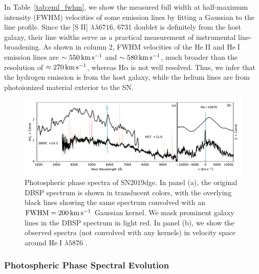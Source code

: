 \documentclass[twocolumn]{aastex63}
\newcommand{\name}{SN2019dge}
\def\ion#1#2{#1$\;${\footnotesize\rm{#2}}\relax}
\begin{document}
In Table~\ref{tab:eml_fwhm}, we show the measured full width at 
half-maximum intensity (FWHM) velocities of some emission lines by fitting a 
Gaussian to the line profile. Since the [\ion{S}{II}] $\lambda\lambda 6716$, 6731 doublet is definitely 
from the host galaxy, their line widths serve as a practical measurement of instrumental 
line-broadening. As shown in column 2, FWHM velocities of the \ion{He}{II} and \ion{He}{I} emission 
lines are $\sim 550\,{\rm km\,s^{-1}}$ and $\sim 580\,{\rm km\,s^{-1}}$, much broader than the 
resolution of $\approx 270\,{\rm km\,s^{-1}}$, whereas H$\alpha$ is not well resolved. Thus, we infer 
that the hydrogen emission is from the host galaxy, while the helium lines are from photoionized 
material exterior to the SN.

\begin{figure}[htbp!]
	\centering
	\includegraphics[width=\textwidth]{figures/spectra_phot.pdf}
	\caption{Photospheric phase spectra of \name. In panel (a), the original DBSP 
		spectrum is shown in translucent colors, with the overlying black lines showing the same 
		spectrum 
		convolved with an ${\rm FWHM} = 200\, {\rm km\, s^{-1}}$ Gaussian kernel. We mask prominent 
		galaxy lines in the DBSP spectrum in light red. In panel (b), we show the observed spectra (not 
		convolved with any kernels) in velocity space around \ion{He}{I} $\lambda 5876$ .
		\label{fig:spectra}}
\end{figure}

\subsubsection{Photospheric Phase Spectral Evolution}  \label{subsubsec:spec_middle}
\end{document}
